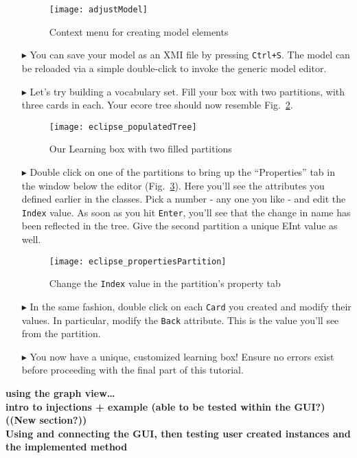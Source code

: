 \begin{itemize}
\begin{figure}[htbp]
	\centering
  \texttt{[image: adjustModel]}
	\caption{Context menu for creating model elements}
	\label{fig:create_instance}
\end{figure}

\item[$\blacktriangleright$] You can save your model as an XMI file by pressing \texttt{Ctrl+S}. The model can be reloaded via a simple double-click to invoke
the generic model editor.

\item[$\blacktriangleright$] Let's try building a vocabulary set. Fill your box with two partitions, with three cards in each. Your ecore tree should now
resemble Fig.~\ref{fig:eclipse_populatedTree}.

\begin{figure}[htbp]
	\centering
  \texttt{[image: eclipse\_populatedTree]}
	\caption{Our Learning box with two filled partitions}
	\label{fig:eclipse_populatedTree}
\end{figure}

\vfill
\pagebreak

\item[$\blacktriangleright$] Double click on one of the partitions to bring up the ``Properties'' tab in the window below the editor
(Fig.~\ref{fig:properties_partition}). Here you'll see the attributes you defined earlier in the classes. Pick a number - any one you like - and edit the
\texttt{Index} value. As soon as you hit \texttt{Enter}, you'll see that the change in name has been reflected in the tree. Give the second partition a unique
EInt value as well.

\begin{figure}[htbp]
	\centering
  \texttt{[image: eclipse\_propertiesPartition]}
	\caption{Change the \texttt{Index} value in the partition's property tab}
	\label{fig:properties_partition}
\end{figure}

\item[$\blacktriangleright$] In the same fashion, double click on each \texttt{Card} you created and modify their values. In particular, modify the
\texttt{Back} attribute. This is the value you'll see from the partition.

\item[$\blacktriangleright$] You now have a unique, customized learning box! Ensure no errors exist before proceeding with the final part of this tutorial.

\end{itemize}

{\bf using the graph view\ldots} \\
{\bf intro to injections + example (able to be tested within the GUI?) ((New section?))} \\
{\bf Using and connecting the GUI, then testing user created instances and the implemented method}
